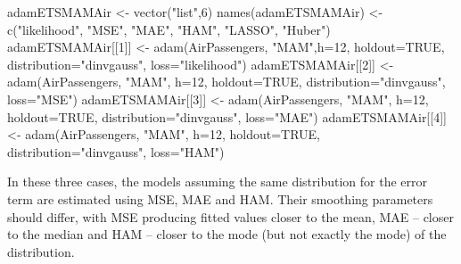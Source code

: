 \documentclass[
]{book}
\newenvironment{Shaded}{\begin{snugshade}}{\end{snugshade}}
\newcommand{\AttributeTok}[1]{\textcolor[rgb]{0.77,0.63,0.00}{#1}}
\newcommand{\ConstantTok}[1]{\textcolor[rgb]{0.00,0.00,0.00}{#1}}
\newcommand{\DecValTok}[1]{\textcolor[rgb]{0.00,0.00,0.81}{#1}}
\newcommand{\FunctionTok}[1]{\textcolor[rgb]{0.00,0.00,0.00}{#1}}
\newcommand{\NormalTok}[1]{#1}
\newcommand{\OtherTok}[1]{\textcolor[rgb]{0.56,0.35,0.01}{#1}}
\newcommand{\StringTok}[1]{\textcolor[rgb]{0.31,0.60,0.02}{#1}}
\theoremstyle{definition}
\theoremstyle{definition}
\theoremstyle{definition}
\theoremstyle{definition}
\theoremstyle{remark}
\begin{document}
\begin{Shaded}
\begin{Highlighting}[]
\NormalTok{adamETSMAMAir }\OtherTok{\textless{}{-}} \FunctionTok{vector}\NormalTok{(}\StringTok{"list"}\NormalTok{,}\DecValTok{6}\NormalTok{)}
\FunctionTok{names}\NormalTok{(adamETSMAMAir) }\OtherTok{\textless{}{-}}
    \FunctionTok{c}\NormalTok{(}\StringTok{"likelihood"}\NormalTok{, }\StringTok{"MSE"}\NormalTok{, }\StringTok{"MAE"}\NormalTok{, }\StringTok{"HAM"}\NormalTok{, }\StringTok{"LASSO"}\NormalTok{, }\StringTok{"Huber"}\NormalTok{)}
\NormalTok{adamETSMAMAir[[}\DecValTok{1}\NormalTok{]] }\OtherTok{\textless{}{-}} \FunctionTok{adam}\NormalTok{(AirPassengers, }\StringTok{"MAM"}\NormalTok{,}\AttributeTok{h=}\DecValTok{12}\NormalTok{, }\AttributeTok{holdout=}\ConstantTok{TRUE}\NormalTok{,}
                           \AttributeTok{distribution=}\StringTok{"dinvgauss"}\NormalTok{,}
                           \AttributeTok{loss=}\StringTok{"likelihood"}\NormalTok{)}
\NormalTok{adamETSMAMAir[[}\DecValTok{2}\NormalTok{]] }\OtherTok{\textless{}{-}} \FunctionTok{adam}\NormalTok{(AirPassengers, }\StringTok{"MAM"}\NormalTok{, }\AttributeTok{h=}\DecValTok{12}\NormalTok{, }\AttributeTok{holdout=}\ConstantTok{TRUE}\NormalTok{,}
                           \AttributeTok{distribution=}\StringTok{"dinvgauss"}\NormalTok{,}
                           \AttributeTok{loss=}\StringTok{"MSE"}\NormalTok{)}
\NormalTok{adamETSMAMAir[[}\DecValTok{3}\NormalTok{]] }\OtherTok{\textless{}{-}} \FunctionTok{adam}\NormalTok{(AirPassengers, }\StringTok{"MAM"}\NormalTok{, }\AttributeTok{h=}\DecValTok{12}\NormalTok{, }\AttributeTok{holdout=}\ConstantTok{TRUE}\NormalTok{,}
                           \AttributeTok{distribution=}\StringTok{"dinvgauss"}\NormalTok{,}
                           \AttributeTok{loss=}\StringTok{"MAE"}\NormalTok{)}
\NormalTok{adamETSMAMAir[[}\DecValTok{4}\NormalTok{]] }\OtherTok{\textless{}{-}} \FunctionTok{adam}\NormalTok{(AirPassengers, }\StringTok{"MAM"}\NormalTok{, }\AttributeTok{h=}\DecValTok{12}\NormalTok{, }\AttributeTok{holdout=}\ConstantTok{TRUE}\NormalTok{,}
                           \AttributeTok{distribution=}\StringTok{"dinvgauss"}\NormalTok{,}
                           \AttributeTok{loss=}\StringTok{"HAM"}\NormalTok{)}
\end{Highlighting}
\end{Shaded}

In these three cases, the models assuming the same distribution for the error term are estimated using MSE, MAE and HAM. Their smoothing parameters should differ, with MSE producing fitted values closer to the mean, MAE -- closer to the median and HAM -- closer to the mode (but not exactly the mode) of the distribution.
\end{document}
